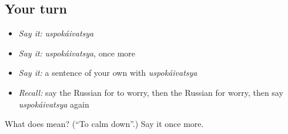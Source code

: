 \subsection*{Your turn}
\begin{itemize}
\raggedright
  \item \emph{Say it:} \emph{uspokáivatsya}
  \item \emph{Say it:} \emph{uspokáivatsya}, once more
  \item \emph{Say it:} a sentence of your own with \emph{uspokáivatsya}
  \item \emph{Recall:} say the Russian for to worry, then the Russian for worry, then say \emph{uspokáivatsya} again
\end{itemize}

\begin{tcolorbox}[breakable,colback=teal!4,colframe=teal!35!black,title={Before you move on}]
What does  mean? (\textquotedblleft{}To calm down\textquotedblright{}.) Say it once more.
\end{tcolorbox}
